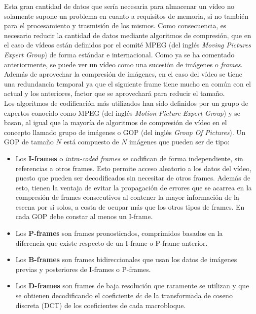 Esta gran cantidad de datos que sería necesaria para almacenar un vídeo no solamente supone un problema en cuanto a requisitos de memoria, si no también para el procesamiento y trasmisión de los mismos. Como consecuencia, es necesario reducir la cantidad de datos mediante algoritmos de compresión, que en el caso de vídeos están definidos por el comité MPEG (del inglés \textit{Moving Pictures Expert Group}) de forma estándar e internacional.
Como ya se ha comentado anteriormente, se puede ver un vídeo como una sucesión de imágenes o \textit{frames}. Además de aprovechar la compresión de imágenes, en el caso del vídeo se tiene una redundancia temporal ya que el siguiente frame tiene mucho en común con el actual y los anteriores, factor que se aprovechará para reducir el tama\~no. \\

Los algoritmos de codificación más utilizados han sido definidos por un grupo de expertos conocido como MPEG (del inglés \textit{Motion Picture Expert Group}) y se basan, al igual que la mayoría de algoritmos de compresión de vídeo en el concepto llamado grupo de imágenes o GOP (del inglés \textit{Group Of Pictures}). Un GOP de tama\~no $N$ está compuesto de $N$ imágenes que pueden ser de tipo:
\begin{itemize}
\item Los \textbf{I-frames} o \textit{intra-coded frames} se codifican de forma independiente, sin referencias a otros frames. Esto permite acceso aleatorio a los datos del vídeo, puesto que pueden ser decodificados sin necesitar de otros frames. Además de esto, tienen la ventaja de evitar la propagación de errores que se acarrea en la compresión de frames consecutivos al contener la mayor información de la escena por si solos, a costa de ocupar más que los otros tipos de frames. En cada GOP debe constar al menos un I-frame.
\item Los \textbf{P-frames} son frames pronosticados, comprimidos basados en la diferencia que existe respecto de un I-frame o P-frame anterior.
\item Los \textbf{B-frames} son frames bidireccionales que usan los datos de imágenes previas y posteriores de I-frames o P-frames.
\item Los \textbf{D-frames} son frames de baja resolución que raramente se utilizan y que se obtienen decodificando el coeficiente $dc$ de la transformada de coseno discreta (DCT) de los coeficientes de cada macrobloque.
\end{itemize} 

